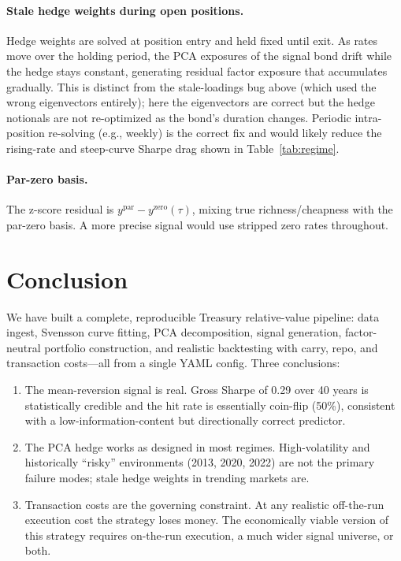 \documentclass[11pt]{article}
\begin{document}
\paragraph{Stale hedge weights during open positions.}
Hedge weights are solved at position entry and held fixed until exit.
As rates move over the holding period, the PCA exposures of the signal bond
drift while the hedge stays constant, generating residual factor exposure that
accumulates gradually. This is distinct from the stale-loadings bug above
(which used the wrong eigenvectors entirely); here the eigenvectors are correct
but the hedge notionals are not re-optimized as the bond's duration changes.
Periodic intra-position re-solving (e.g., weekly) is the correct fix and would
likely reduce the rising-rate and steep-curve Sharpe drag shown in
Table~\ref{tab:regime}.

\paragraph{Par-zero basis.}
The z-score residual is $y^{\text{par}} - y^{\text{zero}}(\tau)$, mixing
true richness/cheapness with the par-zero basis. A more precise signal would
use stripped zero rates throughout.

\section{Conclusion}

We have built a complete, reproducible Treasury relative-value pipeline:
data ingest, Svensson curve fitting, PCA decomposition, signal generation,
factor-neutral portfolio construction, and realistic backtesting with carry,
repo, and transaction costs---all from a single YAML config. Three conclusions:

\begin{enumerate}\setlength\itemsep{2pt}
  \item The mean-reversion signal is real. Gross Sharpe of 0.29 over 40 years
        is statistically credible and the hit rate is essentially coin-flip
        (50\%), consistent with a low-information-content but directionally
        correct predictor.
  \item The PCA hedge works as designed in most regimes. High-volatility and
        historically ``risky'' environments (2013, 2020, 2022) are not the
        primary failure modes; stale hedge weights in trending markets are.
  \item Transaction costs are the governing constraint. At any realistic
        off-the-run execution cost the strategy loses money. The economically
        viable version of this strategy requires on-the-run execution, a much
        wider signal universe, or both.
\end{enumerate}
\end{document}
